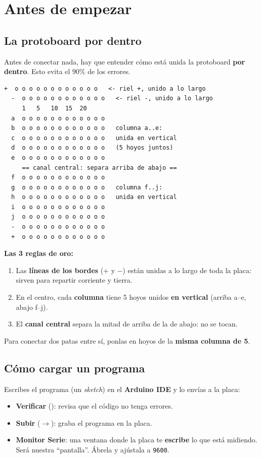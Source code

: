 \documentclass[10pt,letterpaper]{article}
\begin{document}
\section{Antes de empezar}

\subsection{La protoboard por dentro}
Antes de conectar nada, hay que entender cómo está unida la protoboard \textbf{por dentro}. Esto
evita el 90\% de los errores.

\begin{lstlisting}[style=plano]
  +  o o o o o o o o o o o o   <- riel +, unido a lo largo
  -  o o o o o o o o o o o o   <- riel -, unido a lo largo
     1   5   10  15  20
  a  o o o o o o o o o o o o
  b  o o o o o o o o o o o o   columna a..e:
  c  o o o o o o o o o o o o   unida en vertical
  d  o o o o o o o o o o o o   (5 hoyos juntos)
  e  o o o o o o o o o o o o
     == canal central: separa arriba de abajo ==
  f  o o o o o o o o o o o o
  g  o o o o o o o o o o o o   columna f..j:
  h  o o o o o o o o o o o o   unida en vertical
  i  o o o o o o o o o o o o
  j  o o o o o o o o o o o o
  -  o o o o o o o o o o o o
  +  o o o o o o o o o o o o
\end{lstlisting}

\textbf{Las 3 reglas de oro:}
\begin{enumerate}
\item Las \textbf{líneas de los bordes} (+ y $-$) están unidas a lo largo de toda la placa: sirven
para repartir corriente y tierra.
\item En el centro, cada \textbf{columna} tiene 5 hoyos unidos \textbf{en vertical} (arriba a--e,
abajo f--j).
\item El \textbf{canal central} separa la mitad de arriba de la de abajo: no se tocan.
\end{enumerate}
Para conectar dos patas entre sí, ponlas en hoyos de la \textbf{misma columna de 5}.

\subsection{Cómo cargar un programa}
Escribes el programa (un \textit{sketch}) en el \textbf{Arduino IDE} y lo envías a la placa:
\begin{itemize}
\item \textbf{Verificar} (\checkmark): revisa que el código no tenga errores.
\item \textbf{Subir} ($\rightarrow$): graba el programa en la placa.
\item \textbf{Monitor Serie}: una ventana donde la placa te \textbf{escribe} lo que está midiendo.
Será nuestra ``pantalla''. Ábrela y ajústala a \texttt{9600}.
\end{itemize}
\end{document}
